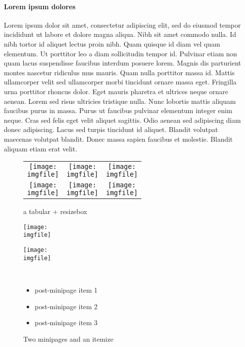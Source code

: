 \documentclass{article}
\def\imgfile{../graphics/none.png}
\begin{document}
\paragraph{Lorem ipsum dolores} Lorem ipsum dolor sit amet, consectetur adipiscing elit, sed do eiusmod tempor incididunt ut labore et dolore magna aliqua. Nibh sit amet commodo nulla. Id nibh tortor id aliquet lectus proin nibh. Quam quisque id diam vel quam elementum. Ut porttitor leo a diam sollicitudin tempor id. Pulvinar etiam non quam lacus suspendisse faucibus interdum posuere lorem. Magnis dis parturient montes nascetur ridiculus mus mauris. Quam nulla porttitor massa id. Mattis ullamcorper velit sed ullamcorper morbi tincidunt ornare massa eget. Fringilla urna porttitor rhoncus dolor. Eget mauris pharetra et ultrices neque ornare aenean. Lorem sed risus ultricies tristique nulla. Nunc lobortis mattis aliquam faucibus purus in massa. Purus ut faucibus pulvinar elementum integer enim neque. Cras sed felis eget velit aliquet sagittis. Odio aenean sed adipiscing diam donec adipiscing. Lacus sed turpis tincidunt id aliquet. Blandit volutpat maecenas volutpat blandit. Donec massa sapien faucibus et molestie. Blandit aliquam etiam erat velit.
\clearpage

\begin{figure*}[htbp]
	\centering
  \begin{tabular}{ccc}
 		\resizebox{5.0cm}{!}{\texttt{[image: \\imgfile]}}&
		\resizebox{5.0cm}{!}{\texttt{[image: \\imgfile]}}&
		\resizebox{5.0cm}{!}{\texttt{[image: \\imgfile]}}\\
		\resizebox{5.0cm}{!}{\texttt{[image: \\imgfile]}}&
		\resizebox{5.0cm}{!}{\texttt{[image: \\imgfile]}}&
		\resizebox{5.0cm}{!}{\texttt{[image: \\imgfile]}}
   \end{tabular}
	\caption{a tabular + resizebox}
\end{figure*}
\clearpage


\begin{figure}
  \begin{minipage}[t]{0.4\textwidth}
    \texttt{[image: \\imgfile]}
  \end{minipage}
  \begin{minipage}[t]{0.4\textwidth}
    \texttt{[image: \\imgfile]}
  \end{minipage} \\
  \begin{center}\begin{itemize}
    \item post-minipage item 1
    \item post-minipage item 2
    \item post-minipage item 3
  \end{itemize}\end{center}
  \caption{Two minipages and an itemize}
\end{figure}
\clearpage
\end{document}
